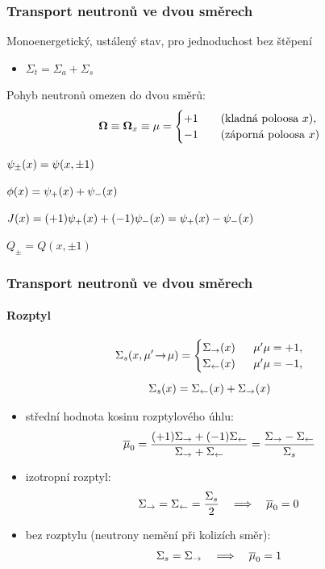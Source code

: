 \begin{frame}
  \frametitle{Transport neutronů ve dvou směrech}
  
  \begin{myitemize}
    \item Monoenergetický, ustálený stav, pro jednoduchost bez štěpení
    \begin{itemize}
    	\item $\Sigma_t = \Sigma_a + \Sigma_s$
    \end{itemize}
	  \item Pohyb neutronů omezen do dvou směrů:
	  $$
	    \mathbf{\Omega} \equiv \mathbf{\Omega}_x \equiv \mu = 
	    \begin{cases}
	      +1 & \quad \mbox{(kladná poloosa $x$)},\\
	      -1 & \quad \mbox{(záporná poloosa $x$)}
	    \end{cases}
	  $$
	  \item<2-> $\psi_{\pm}(x) = \psi(x,\pm 1)$
	  \item<2-> $\phi(x) = \psi_+(x) + \psi_-(x)$
	  \item<2-> $J(x) = (+1)\psi_+(x) + (-1)\psi_-(x) = \psi_+(x) - \psi_-(x)$
	  \item<2-> $Q_\pm = Q(x,\pm 1)$
  \end{myitemize}

\end{frame}

\begin{frame}
  \frametitle{Transport neutronů ve dvou směrech}
  \framesubtitle{Rozptyl}
    \vspace{-1em}
	  \begin{gather*}
      \Sigma_s(x,\mu'\!\rightarrow\!\mu) = 
      \begin{cases}
        \Sigma_{\rightarrow}(x) & \ \; \mu'\mu = +1,\\
        \Sigma_{\leftarrow}(x) & \ \; \mu'\mu = -1,
      \end{cases}\\[.5em]
	    \Sigma_s(x) = \Sigma_{\leftarrow}(x) + \Sigma_{\rightarrow}(x)
    \end{gather*}

    \begin{itemize}
    	\item střední hodnota kosinu rozptylového úhlu:
    	$$
    	  \overline{\mu}_0 = \frac{(+1)\Sigma_{\rightarrow} + (-1)\Sigma_{\leftarrow}}{\Sigma_{\rightarrow} + \Sigma_{\leftarrow}} = \frac{\Sigma_{\rightarrow} - \Sigma_{\leftarrow}}{\Sigma_s}
    	$$
    	\item<2-> izotropní rozptyl: $$\Sigma_{\rightarrow} = \Sigma_{\leftarrow} = \frac{\Sigma_s}{2}\quad \Longrightarrow\quad \overline{\mu}_0 = 0$$
    	\item<2-> bez rozptylu (neutrony nemění při kolizích směr):
          	$$\Sigma_s = \Sigma_{\rightarrow} \quad \Longrightarrow\quad \overline{\mu}_0 = 1$$
    \end{itemize}

\end{frame}

